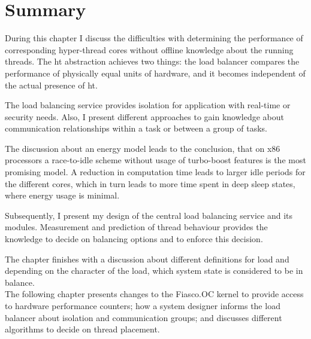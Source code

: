 \section{Summary}
\label{design:summary}

During this chapter I discuss the difficulties with determining the
performance of corresponding hyper-thread cores without offline knowledge about
the running threads.
The \gls{ht} abstraction achieves two things: the load balancer compares the
performance of physically equal units of hardware, and it becomes independent
of the actual presence of \gls{ht}.

The load balancing service provides isolation for application with real-time
or security needs.
Also, I present different approaches to gain knowledge about communication
relationships within a task or between a group of tasks.

The discussion about an energy model leads to the conclusion, that on x86
processors a race-to-idle scheme without usage of turbo-boost features is the
most promising model.
A reduction in computation time leads to larger idle periods for the different
cores, which in turn leads to more time spent in deep sleep states, where
energy usage is minimal.

Subsequently, I present my design of the central load balancing service and its
modules.
Measurement and prediction of thread behaviour provides the knowledge to decide
on balancing options and to enforce this decision.

The chapter finishes with a discussion about different definitions for load
and depending on the character of the load, which system state is considered to
be in balance.
\\

The following chapter presents changes to the Fiasco.OC kernel to provide
access to hardware performance counters; how a system designer informs the load
balancer about isolation and communication groups; and discusses different
algorithms to decide on thread placement.
